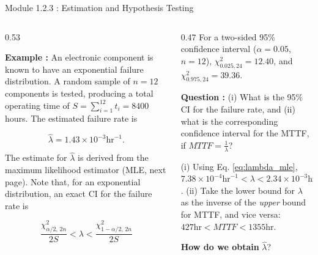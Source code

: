 \documentclass{beamer}
\begin{document}
\begin{frame}{Module 1.2.3 : Estimation and Hypothesis Testing}
\begin{columns}[T]
\begin{column}{0.53\textwidth}
\scriptsize

\textbf{Example : } An electronic component is known to have an exponential failure distribution. A random sample of $n=12$ components is tested, producing a total operating time of $S=\sum_{i=1}^{12}t_i=8400$ hours. The estimated failure rate is

\begin{equation}
\hat{\lambda} = 1.43\times10^{-3} \text{hr}^{-1}.
\end{equation}

The estimate for $\hat{\lambda}$ is derived from the maximum likelihood estimator (MLE, next page).  Note that, for an exponential distribution, an exact CI for the failure rate is

\begin{equation}
\frac{\chi^2_{\alpha/2,\,2n}}{2S}<\lambda<\frac{\chi^2_{1-\alpha/2,\,2n}}{2S} \label{eq:lambda_mle}
\end{equation}
\end{column}

\begin{column}{0.47\textwidth}
\scriptsize
For a two-sided 95\% confidence interval ($\alpha = 0.05$, $n=12$), $\chi^2_{0.025,24}=12.40$, and $\chi^2_{0.975,24}=39.36$. \\ \vspace{0.25cm}

\textbf{Question : } (i) What is the 95\% CI for the failure rate, and (ii) what is the corresponding confidence interval for the MTTF, if $MTTF=\frac{1}{\lambda}$? \\ \vspace{0.25cm}

(i) Using Eq. \ref{eq:lambda_mle}, $7.38\times 10^{-4} \text{hr}^{-1} < \lambda < 2.34 \times 10^{-3} \text{hr}^{-1}$.  (ii) Take the lower bound for $\lambda$ as the inverse of the \textit{upper} bound for MTTF, and vice versa: $427\text{hr} < MTTF < 1355 \text{hr}$. \\ \vspace{0.25cm}

\textbf{How do we obtain} $\hat{\lambda}$?
\end{column}
\end{columns}
\end{frame}
\end{document}
